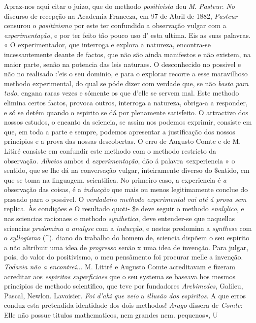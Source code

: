 Apraz-nos aqui citar o juizo, que do methodo \emph{positivista} deu \emph{M}. \emph{Pasteur}. \emph{No} discurso de recepção na Academia Franceza, em 97 de Abril de 1882, \emph{Pasteur} censurou o \emph{positivismo} por este ter confundido a observação vulgar com a \emph{experimentação}, e por ter feito tão pouco uso d' esta ultima. Eis as suas palavras. « O experimentador, que interroga e explora a natureza, encontra-se incessantemente deante de factos, que não são ainda manifestos e não existem, na maior parte, senão na potencia das leis naturaes. O desconhecido no possivel e não no realisado :'eis o seu dominio, e para o explorar recorre a esse maravilhoso methodo experimental, do qual se póde dizer com verdade que, se não \emph{basta para tudo}, engana raras vezes e sómente os que d'elle se servem mal. Este methodo elimina certos factos, provoca outros, interroga a natureza, obriga-a a responder, e só se detém quando o espirito se dá por plenamente satisfeito. O attractivo dos nossos estudos, o encanto da sciencia, se assim nos podemos exprimir, consiste em que, em toda a parte e sempre, podemos apresentar a justificação dos nossos principios e a prova das nossas descobertas. O erro de Augusto Comte e de M. Litiré consiste em confundir este methodo com o methodo restricto da observação. \emph{Alkeios} ambos d \emph{experimentação}, dão á palavra «experiencia » o sentido, que se lhe dá na conversação vulgar, inteiramente diverso do \$entido, cm que se toma na linguagem. scientifica. No primeiro caso, a experiencia é \emph{a} observação das coisas, é a \emph{inducção} que mais ou menos legitimamente conclue do passado para o possivel. O \emph{verdadeiro methodo experimental vai até á prova sem} replica. Às condições e O resultado quoti-   \$e deve seguir o methodo \emph{enalylico}, e nas sciencias racionaes o methodo \emph{synihetico}, deve entender-se que naquellas sciencias \emph{predomina a analyse} com a \emph{inducção}, e nestas predomina a \emph{synthese} com o \emph{syllogismo} (\textasciicircum{}). diano do trabalho do homem de, sciencia dispõem o seu espirito a não altribuir uma idea de \emph{progresso} senão x uma idea de invenção. Para julgar, pois, do valor do positivismo, o meu pensâmento foi procurar melle a invenção. \emph{Todavia não a encontrei}... M. Littré e Augusto Comte acreditavam e fizeram acreditar aos \emph{espiritos superficiaes} que o seu systema se baseava hos mesmos principios de methodo scientifico, que teve por fundadores \emph{Arcbimedes}, Galileu, Pascal, Newlon. Lavoisier. \emph{Foi d'ahi que veio} a \emph{illusão dos espiritos}. A que erros conduz esta pretendida identidade dos dois methodos! \emph{Arago} dissera de \emph{Comte}: Elle não possue titulos mathematicos, nem grandes nem. pequenos», U

